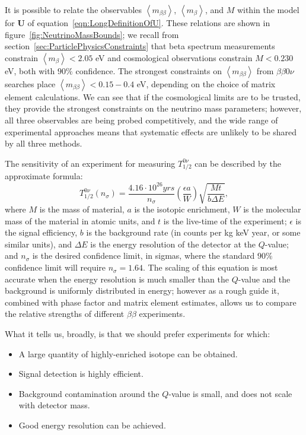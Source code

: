 It is possible to relate the observables $\left< m_{\beta\beta} \right>$, $\left< m_\beta \right>$, and $M$ within the model for $\mathbf{U}$ of equation~\ref{eqn:LongDefinitionOfU}.  These relations are shown in figure~\ref{fig:NeutrinoMassBounds}; we recall from section~\ref{sec:ParticlePhysicsConstraints} that beta spectrum measurements constrain $\left<m_\beta\right> < 2.05$ eV and cosmological observations constrain $M < 0.230$ eV, both with $90\%$ confidence.  The strongest constraints on $\left<m_{\beta\beta}\right>$ from $\beta\beta 0\nu$ searches place $\left<m_{\beta\beta}\right> < 0.15-0.4$ eV, depending on the choice of matrix element calculations.  We can see that if the cosmological limits are to be trusted, they provide the strongest constraints on the neutrino mass parameters; however, all three observables are being probed competitively, and the wide range of experimental approaches means that systematic effects are unlikely to be shared by all three methods.

The sensitivity of an experiment for measuring $T_{1/2}^{0\nu}$ can be described by the approximate formula:~\cite{RMPbb0n}
\begin{equation}\label{eqn:ApproxHalflifeSensitivity}
T_{1/2}^{0\nu}(n_\sigma) = \frac{4.16 \cdot 10^{26} yrs}{n_\sigma} \left( \frac{\epsilon a}{W}\right) \sqrt{\frac{Mt}{b \Delta E}},
\end{equation}
where $M$ is the mass of material, $a$ is the isotopic enrichment, $W$ is the molecular mass of the material in atomic units, and $t$ is the live-time of the experiment; $\epsilon$ is the signal efficiency, $b$ is the background rate (in counts per kg keV year, or some similar units), and $\Delta E$ is the energy resolution of the detector at the $Q$-value; and $n_\sigma$ is the desired confidence limit, in sigmas, where the standard $90\%$ confidence limit will require $n_\sigma = 1.64$.  The scaling of this equation is most accurate when the energy resolution is much smaller than the $Q$-value and the background is uniformly distributed in energy; however as a rough guide it, combined with phase factor and matrix element estimates, allows us to compare the relative strengths of different $\beta\beta$ experiments.

What it tells us, broadly, is that we should prefer experiments for which:
\begin{itemize}
\item A large quantity of highly-enriched isotope can be obtained.
\item Signal detection is highly efficient.
\item Background contamination around the $Q$-value is small, and does not scale with detector mass.
\item Good energy resolution can be achieved.
\end{itemize}

